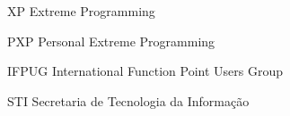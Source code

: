 \begin{siglas}
  \item[XP] Extreme Programming
  \item[PXP] Personal Extreme Programming
  \item[IFPUG] International Function Point Users Group
  \item[STI] Secretaria de Tecnologia da Informação
\end{siglas}
